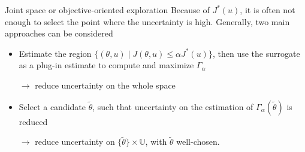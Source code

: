 \documentclass[10pt,aspectratio=169]{beamer}
\newcommand{\Uspace}{\mathbb{U}}
\newcommand{\kk}{\theta}
\newcommand{\uu}{u}
\begin{document}
\begin{frame}{Joint space or objective-oriented exploration}
  Because of $J^*(\uu)$, it is often not enough to select the point
  where the uncertainty is high.  Generally, two main approaches can
  be considered
  \begin{itemize}
  \item Estimate the region
    $\{(\kk, \uu) \mid J(\kk,\uu) \leq \alpha J^*(\uu)\}$, then use
    the surrogate as a plug-in estimate to compute and maximize
    $\Gamma_{\alpha}$

    $\rightarrow$ reduce uncertainty on the whole space
  \item Select a candidate $\tilde{\kk}$, such that uncertainty on the
    estimation of $\Gamma_{\alpha}(\tilde{\kk})$ is reduced

    $\rightarrow$ reduce uncertainty on
    $\{\tilde{\kk}\}\times\Uspace$, with $\tilde{\kk}$ well-chosen.
  \end{itemize}
\end{frame}
\end{document}
